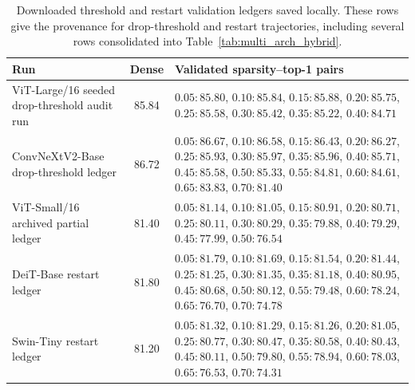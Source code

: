 \documentclass[11pt]{article}
\theoremstyle{plain}
\theoremstyle{definition}
\theoremstyle{remark}
\newcommand{\1}{\mathbf{1}}
\begin{document}
\begin{table}[ht]
\centering
\caption{Downloaded threshold and restart validation ledgers saved locally.  These rows give the provenance for drop-threshold and restart trajectories, including several rows consolidated into Table~\ref{tab:multi_arch_hybrid}.}
\label{tab:additional_downloaded_validation_ledger}
\scriptsize
\setlength{\tabcolsep}{3pt}
\begin{tabularx}{\textwidth}{p{4.3cm}cX}
\toprule
Run & Dense & Validated sparsity--top-1 pairs \\
\midrule
ViT-Large/16 seeded drop-threshold audit run
& 85.84
& \(0.05:85.80\), \(0.10:85.84\), \(0.15:85.88\), \(0.20:85.75\), \(0.25:85.58\), \(0.30:85.42\), \(0.35:85.22\), \(0.40:84.71\) \\
ConvNeXtV2-Base drop-threshold ledger
& 86.72
& \(0.05:86.67\), \(0.10:86.58\), \(0.15:86.43\), \(0.20:86.27\), \(0.25:85.93\), \(0.30:85.97\), \(0.35:85.96\), \(0.40:85.71\), \(0.45:85.58\), \(0.50:85.33\), \(0.55:84.81\), \(0.60:84.61\), \(0.65:83.83\), \(0.70:81.40\) \\
ViT-Small/16 archived partial ledger
& 81.40
& \(0.05:81.14\), \(0.10:81.05\), \(0.15:80.91\), \(0.20:80.71\), \(0.25:80.11\), \(0.30:80.29\), \(0.35:79.88\), \(0.40:79.29\), \(0.45:77.99\), \(0.50:76.54\) \\
DeiT-Base restart ledger
& 81.80
& \(0.05:81.79\), \(0.10:81.69\), \(0.15:81.54\), \(0.20:81.44\), \(0.25:81.25\), \(0.30:81.35\), \(0.35:81.18\), \(0.40:80.95\), \(0.45:80.68\), \(0.50:80.12\), \(0.55:79.48\), \(0.60:78.24\), \(0.65:76.70\), \(0.70:74.78\) \\
Swin-Tiny restart ledger
& 81.20
& \(0.05:81.32\), \(0.10:81.29\), \(0.15:81.26\), \(0.20:81.05\), \(0.25:80.77\), \(0.30:80.47\), \(0.35:80.58\), \(0.40:80.43\), \(0.45:80.11\), \(0.50:79.80\), \(0.55:78.94\), \(0.60:78.03\), \(0.65:76.53\), \(0.70:74.31\) \\
\bottomrule
\end{tabularx}
\end{table}
\end{document}
